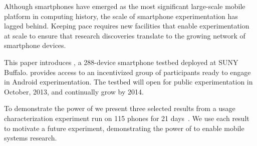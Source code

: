 Although smartphones have emerged as the most significant large-scale mobile
platform in computing history, the scale of smartphone experimentation has
lagged behind. Keeping pace requires new facilities that enable
experimentation at scale to ensure that research discoveries translate to the
growing network of smartphone devices.

This paper introduces \PhoneLab{}, a 288-device smartphone testbed deployed
at SUNY Buffalo. \PhoneLab{} provides access to an incentivized group of
participants ready to engage in Android experimentation. The testbed will
open for public experimentation in October, 2013, and continually grow by 2014.

To demonstrate the power of \PhoneLab{} we present three selected results
from a usage characterization experiment run on 115 phones for 21
days~. We use each result to
motivate a future \PhoneLab{} experiment, demonstrating the power of
\PhoneLab{} to enable mobile systems research.
